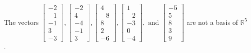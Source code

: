 \begin{exercise}
\begin{exerciseStatement}
  \end{exerciseStatement}
  \begin{exerciseAnswer}
   The vectors \(\left[\begin{array}{r}
-2 \\
-1 \\
-1 \\
3 \\
-3
\end{array}\right] , \left[\begin{array}{r}
-2 \\
4 \\
-4 \\
-1 \\
3
\end{array}\right] , \left[\begin{array}{r}
4 \\
-8 \\
8 \\
2 \\
-6
\end{array}\right] , \left[\begin{array}{r}
1 \\
-2 \\
-3 \\
0 \\
-4
\end{array}\right] , \text{ and } \left[\begin{array}{r}
-5 \\
5 \\
8 \\
3 \\
9
\end{array}\right]\) 
  	 are not  a basis of \(\mathbb{R}^5\).
  


  \end{exerciseAnswer}
\end{exercise}